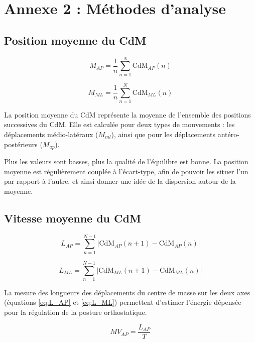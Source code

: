 \newpage
\section{Annexe 2 : Méthodes d'analyse}
\label{annexe:2}

\subsection{Position moyenne du CdM}

\begin{equation}
  M_{AP} = \frac{1}{n} \sum_{n=1}^N \mbox{CdM}_{AP}(n) 
  \label{eq:M_AP}
\end{equation}

\begin{equation}
  M_{ML} = \frac{1}{n} \sum_{n=1}^N \mbox{CdM}_{ML}(n) 
  \label{eq:M_ML}
\end{equation}

La position moyenne du CdM représente la moyenne de l'ensemble des positions successives du CdM. 
Elle est calculée pour deux types de mouvements : les déplacements médio-latéraux ($M_{ml}$), ainsi que pour les déplacements antéro-postérieurs ($M_{ap}$).

Plus les valeurs sont basses, plus la qualité de l'équilibre est bonne.
La position moyenne est régulièrement couplée à l'écart-type, afin de pouvoir les situer l'un par rapport à l'autre, et ainsi donner une idée de la dispersion autour de la moyenne.

\subsection{Vitesse moyenne du CdM}

\begin{equation}
  L_{AP} = \sum_{n=1}^{N-1} \left| \mbox{CdM}_{AP}(n+1) - \mbox{CdM}_{AP}(n) \right|
  \label{eq:L_AP}
\end{equation}

\begin{equation}
  L_{ML} = \sum_{n=1}^{N-1} \left| \mbox{CdM}_{ML}(n+1) - \mbox{CdM}_{ML}(n) \right|
  \label{eq:L_ML}
\end{equation}

La mesure des longueurs des déplacements du centre de masse sur les deux axes (équations \ref{eq:L_AP} et \ref{eq:L_ML}) permettent d'estimer l'énergie dépensée pour la régulation de la posture orthostatique.

\begin{equation}
    MV_{AP} = \frac{L_{AP}}{T}
    \label{eq:MV_AP}
\end{equation}

